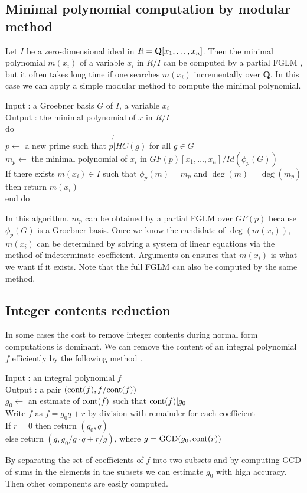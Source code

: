 \documentclass[runningheads]{cl2emult}
\def\cont{{\rm cont}}
\def\GCD{{\rm GCD}}
\begin{document}
\subsection{Minimal polynomial computation by modular method}
Let $I$ be a zero-dimensional ideal in $R={\bf Q}[x_1,\ldots,x_n]$.
Then the minimal polynomial $m(x_i)$ of a variable $x_i$ in $R/I$ can
be computed by a partial FGLM \cite{FGLM}, but it often takes long
time if one searches $m(x_i)$ incrementally over {\bf Q}.  In this
case we can apply a simple modular method to compute the minimal
polynomial.
\begin{tabbing}
Input : a Groebner basis $G$ of $I$, a variable $x_i$\\
Output : the minimal polynomial of $x$ in $R/I$\\
do \= \\
\> $p \leftarrow$ a new prime such that $p \not{|} HC(g)$ for all $g \in G$\\
\> $m_p \leftarrow$ the minimal polynomial of $x_i$ in $GF(p)[x_1,\ldots,x_n]/Id(\phi_p(G))$\\
\> If there exists $m(x_i) \in I$ such that $\phi_p(m) = m_p$ and $\deg(m)=\deg(m_p)$\\
\> then return $m(x_i)$\\
end do
\end{tabbing}
In this algorithm, $m_p$ can be obtained by a partial FGLM over
$GF(p)$ because $\phi_p(G)$ is a Groebner basis. Once we know the
candidate of $\deg(m(x_i))$, $m(x_i)$ can be determined by solving a
system of linear equations via the method of indeterminate
coefficient. Arguments on \cite{NOYO} ensures that $m(x_i)$ is what we
want if it exists. Note that the full FGLM can also be computed by the
same method.

\subsection{Integer contents reduction}

In some cases the cost to remove integer contents during normal form
computations is dominant. We can remove the content of an integral
polynomial $f$ efficiently by the following method \cite{REPL}.
\begin{tabbing}
Input : an integral polynomial $f$\\
Output : a pair $(\cont(f),f/\cont(f))$\\
$g_0 \leftarrow$ an estimate of $\cont(f)$ such that $\cont(f)|g_0$\\
Write $f$ as $f = g_0q+r$ by division with remainder for each coefficient\\
If $r = 0$ then return $(g_0,q)$\\
else return $(g,g_0/g \cdot q + r/g)$, where $g = \GCD(g_0,\cont(r))$
\end{tabbing}
By separating the set of coefficients of $f$ into two subsets and by
computing GCD of sums in the elements in the subsets we can estimate
$g_0$ with high accuracy. Then other components are easily computed.
\end{document}
